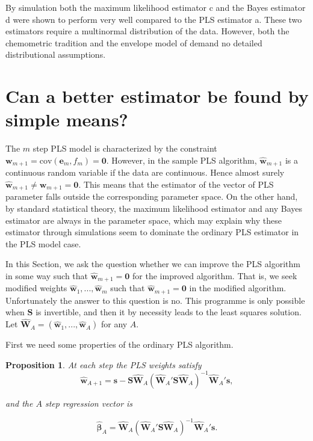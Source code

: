 \documentclass[a4paper, 11pt]{article}
\newtheorem{proposition}{Proposition} \theoremstyle{remark}
\begin{document}
By simulation both the maximum likelihood estimator c and the Bayes estimator d were shown to perform very well compared to the PLS estimator a. These two estimators require a multinormal distribution of the data. However, both the chemometric tradition and the envelope model of \citet{cook2013envelopes, cook2010envelope} demand no detailed distributional assumptions.

\section{Can a better estimator be found by simple means?}

The $m$ step PLS model is characterized by the constraint $\bm{w}_{m+1}=\mathrm{cov}(\bm{e}_m ,f_m)=\bm{0}$. However, in the sample PLS algorithm, $\widehat{\bm{w}}_{m+1}$ is a continuous random variable if the data are continuous. Hence almost surely $\widehat{\bm{w}}_{m+1}\ne\bm{w}_{m+1}=\bm{0}$. This means that the estimator of the vector of PLS parameter falls outside the corresponding parameter space. On the other hand, by standard statistical theory, the maximum likelihood estimator and any Bayes estimator are always in the parameter space, which may explain why these estimator through simulations seem to dominate the ordinary PLS estimator in the PLS model case.

In this Section, we ask the question whether we can improve the PLS algorithm in some way such that $\widehat{\bm{w}}_{m+1}=\bm{0}$ for the improved algorithm. That is, we seek modified weights $\widehat{\bm{w}}_{1},...,\widehat{\bm{w}}_{m}$ such that $\widehat{\bm{w}}_{m+1}=\bm{0}$ in the modified algorithm. Unfortunately the answer to this question is no. This programme is only possible when $\bm{S}$ is invertible, and then it by necessity leads to the least squares solution. Let $\widehat{\bm{W}}_A=(\widehat{\bm{w}}_1,...,\widehat{\bm{w}}_A)$ for any $A$.

First we need some properties of the ordinary PLS algorithm.
\bigskip

\begin{proposition}
  At each step the PLS weights satisfy
  \begin{equation}
    \widehat{\bm{w}}_{A+1} =
    \bm{s}-\bm{S}\widehat{\bm{W}}_{A}
    (\widehat{\bm{W}}_{A}'\bm{S}\widehat{\bm{W}}_{A})^{-1}
    \widehat{\bm{W}}_{A}'\bm{s},
    \label{weight}
  \end{equation}

and the $A$ step regression vector is

\begin{equation}
  \widehat{\bm{\beta}}_{A} =
  \widehat{\bm{W}}_{A}
  (\widehat{\bm{W}}_{A}'\bm{S}\widehat{\bm{W}}_{A})^{-1}
  \widehat{\bm{W}}_{A}'\bm{s}.
  \label{regression}
\end{equation}
\end{proposition}
\end{document}
